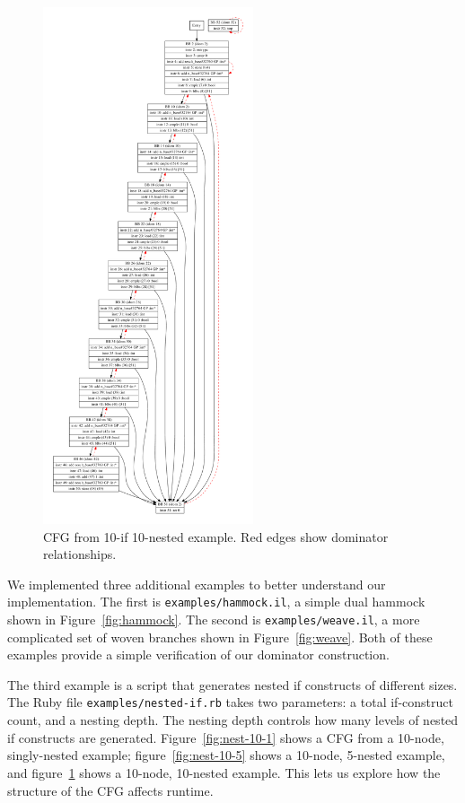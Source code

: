\documentclass[10pt,twocolumn]{article}
\begin{document}
\begin{figure}
\begin{center}
  \includegraphics[height=6in]{figs/nested-if-10-10.pdf}
  \caption{CFG from 10-if 10-nested example. Red edges show dominator relationships.}
  \label{fig:nest-10-10} 
\end{center}
\end{figure}

We implemented three additional examples to better understand our
implementation. The first is \texttt{examples/hammock.il}, a simple
dual hammock shown in Figure~\ref{fig:hammock}. The second is
\texttt{examples/weave.il}, a more complicated set of woven branches
shown in Figure~\ref{fig:weave}. Both of these examples provide a simple
verification of our dominator construction.

The third example is a script that generates nested if constructs of
different sizes. The Ruby file \texttt{examples/nested-if.rb} takes
two parameters: a total if-construct count, and a nesting depth. The
nesting depth controls how many levels of nested if constructs are
generated.  Figure~\ref{fig:nest-10-1} shows a CFG from a 10-node,
singly-nested example; figure~\ref{fig:nest-10-5} shows a 10-node,
5-nested example, and figure~\ref{fig:nest-10-10} shows a 10-node,
10-nested example. This lets us explore how the structure of the CFG
affects runtime.
\end{document}
